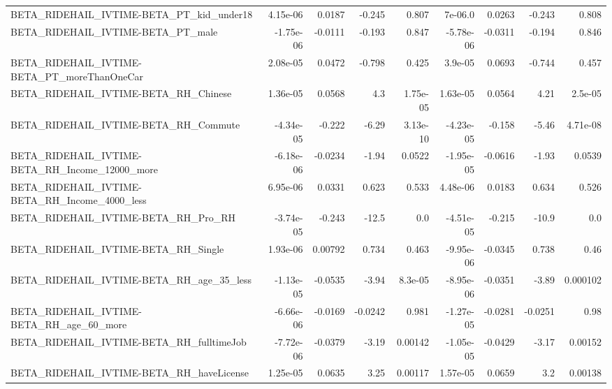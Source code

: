 \begin{tabular}{lrrrrrrrr}
BETA\_RIDEHAIL\_IVTIME-BETA\_PT\_kid\_under18           &    4.15e-06 &       0.0187 &    -0.245 &    0.807 &    7e-06.0 &      0.0263 &       -0.243 &         0.808 \\
BETA\_RIDEHAIL\_IVTIME-BETA\_PT\_male                  &   -1.75e-06 &      -0.0111 &    -0.193 &    0.847 &  -5.78e-06 &     -0.0311 &       -0.194 &         0.846 \\
BETA\_RIDEHAIL\_IVTIME-BETA\_PT\_moreThanOneCar        &    2.08e-05 &       0.0472 &    -0.798 &    0.425 &    3.9e-05 &      0.0693 &       -0.744 &         0.457 \\
BETA\_RIDEHAIL\_IVTIME-BETA\_RH\_Chinese               &    1.36e-05 &       0.0568 &       4.3 & 1.75e-05 &   1.63e-05 &      0.0564 &         4.21 &       2.5e-05 \\
BETA\_RIDEHAIL\_IVTIME-BETA\_RH\_Commute               &   -4.34e-05 &       -0.222 &     -6.29 & 3.13e-10 &  -4.23e-05 &      -0.158 &        -5.46 &      4.71e-08 \\
BETA\_RIDEHAIL\_IVTIME-BETA\_RH\_Income\_12000\_more     &   -6.18e-06 &      -0.0234 &     -1.94 &   0.0522 &  -1.95e-05 &     -0.0616 &        -1.93 &        0.0539 \\
BETA\_RIDEHAIL\_IVTIME-BETA\_RH\_Income\_4000\_less      &    6.95e-06 &       0.0331 &     0.623 &    0.533 &   4.48e-06 &      0.0183 &        0.634 &         0.526 \\
BETA\_RIDEHAIL\_IVTIME-BETA\_RH\_Pro\_RH                &   -3.74e-05 &       -0.243 &     -12.5 &      0.0 &  -4.51e-05 &      -0.215 &        -10.9 &           0.0 \\
BETA\_RIDEHAIL\_IVTIME-BETA\_RH\_Single                &    1.93e-06 &      0.00792 &     0.734 &    0.463 &  -9.95e-06 &     -0.0345 &        0.738 &          0.46 \\
BETA\_RIDEHAIL\_IVTIME-BETA\_RH\_age\_35\_less           &   -1.13e-05 &      -0.0535 &     -3.94 &  8.3e-05 &  -8.95e-06 &     -0.0351 &        -3.89 &      0.000102 \\
BETA\_RIDEHAIL\_IVTIME-BETA\_RH\_age\_60\_more           &   -6.66e-06 &      -0.0169 &   -0.0242 &    0.981 &  -1.27e-05 &     -0.0281 &      -0.0251 &          0.98 \\
BETA\_RIDEHAIL\_IVTIME-BETA\_RH\_fulltimeJob           &   -7.72e-06 &      -0.0379 &     -3.19 &  0.00142 &  -1.05e-05 &     -0.0429 &        -3.17 &       0.00152 \\
BETA\_RIDEHAIL\_IVTIME-BETA\_RH\_haveLicense           &    1.25e-05 &       0.0635 &      3.25 &  0.00117 &   1.57e-05 &      0.0659 &          3.2 &       0.00138 \\

\end{tabular}
